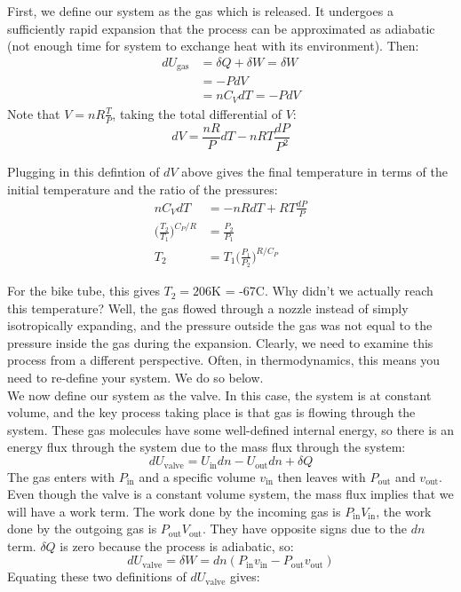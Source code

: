 \documentclass[12pt]{article}
\begin{document}
First, we define our system as the gas which is released. It undergoes a sufficiently rapid expansion that the process can be approximated as adiabatic (not enough time for system to exchange heat with its environment). Then:
\begin{align*}
dU_\text{gas} &= \delta Q + \delta W = \delta W \\
&= -P dV\\
&= n C_V dT = -P dV
\end{align*}
Note that $V = nR\frac{T}{P}$, taking the total differential of $V$:
$$
dV = \frac{n R}{P} dT - nRT \frac{dP}{P^2}
$$


Plugging in this defintion of $dV$ above gives the final temperature in terms of the initial temperature and the ratio of the pressures:
\begin{align*}
nC_V dT &= -nRdT + RT \frac{dP}{P}\\
\Big(\frac{T_2}{T_1}\Big)^{C_P/ R} &= \frac{P_2}{P_1}\\
T_2 &= T_1 \Big(\frac{P_1}{P_2}\Big)^{R/C_P}
\end{align*}

For the bike tube, this gives $T_2 = 206$K = -67\degree C.  Why didn't we actually reach this temperature?  Well, the gas flowed through a nozzle instead of simply isotropically expanding, and the pressure outside the gas was not equal to the pressure inside the gas during the expansion. Clearly, we need to examine this process from a different perspective. Often, in thermodynamics, this means you need to re-define your system. We do so below.\\

We now define our system as the valve. In this case, the system is at constant volume, and the key process taking place is that gas is flowing through the system. These gas molecules have some well-defined internal energy, so there is an energy flux through the system due to the mass flux through the system:
\begin{equation}
dU_\text{valve} = U_\text{in} d n - U_\text{out} d n + \delta Q
\end{equation}
The gas enters with $P_\text{in}$ and a specific volume $v_\text{in}$ then leaves with $P_\text{out}$ and $v_\text{out}$.  Even though the valve is a constant volume system, the mass flux implies that we will have a work term. The work done by the incoming gas is $P_\text{in} V_\text{in}$, the work done by the outgoing gas is $P_\text{out} V_\text{out}$. They have opposite signs due to the $dn$ term. $\delta Q$ is zero because the process is adiabatic, so:
\begin{equation}
dU_\text{valve} = \delta W = d n (P_\text{in} v_\text{in} - P_\text{out} v_\text{out})
\end{equation}
Equating these two definitions of $dU_\text{valve}$ gives:
\end{document}
